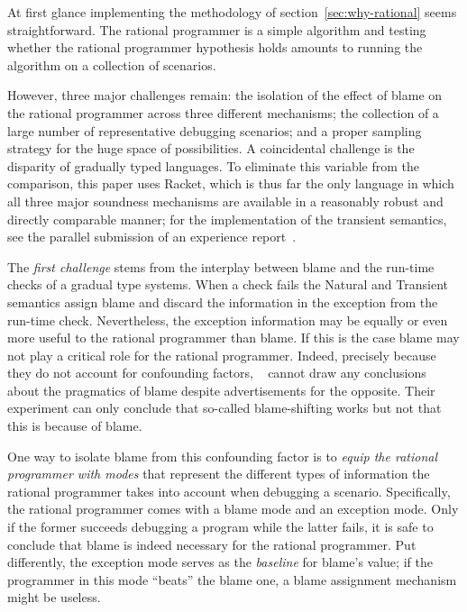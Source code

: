 
At first glance implementing the methodology of
section~\ref{sec:why-rational} seems straightforward. The rational
programmer is a simple algorithm and testing whether the rational
programmer hypothesis holds amounts to running the algorithm on a
collection of scenarios. 

However, three major challenges remain:  the isolation of the effect of
blame on the rational programmer across three different mechanisms; the
collection of a large number of representative debugging scenarios;  and a
proper sampling strategy for the huge space of possibilities. A
coincidental challenge is the disparity of gradually typed languages. To
eliminate this variable from the comparison, this paper uses Racket, which
is thus far the only language in which all three major soundness
mechanisms are available in a reasonably robust and directly comparable
manner; for the implementation of the transient semantics, see the
parallel submission of an experience report~\cite{ttt21}.

The {\em first challenge\/} stems from the interplay between blame and the
run-time checks of a gradual type systems. When a check fails the Natural
and Transient semantics assign blame and discard  the information in the
exception from the run-time check. Nevertheless, the exception
information may be equally or even more useful to the rational programmer
than blame. If this is the case blame may not play a critical role for the
rational programmer. Indeed, precisely because they do not
account for confounding factors, ~\citet{lksfd-popl-2020} cannot draw any
conclusions about the pragmatics of blame despite advertisements for the
opposite. Their experiment can only conclude that so-called blame-shifting
works but not that this is because of blame. 

One way to isolate blame from this confounding factor is to {\em equip the
rational programmer with modes \/} that represent the different types of
information the rational programmer takes into account when debugging a
scenario. Specifically, the rational programmer comes with a blame mode and
an exception mode. Only if the former succeeds debugging a program while
the latter fails, it is safe to conclude that blame is indeed necessary
for the rational programmer. Put differently, the exception mode serves as
the {\em baseline\/} for blame's value; if the programmer in this mode
``beats'' the  blame one, a blame assignment mechanism might be useless.

